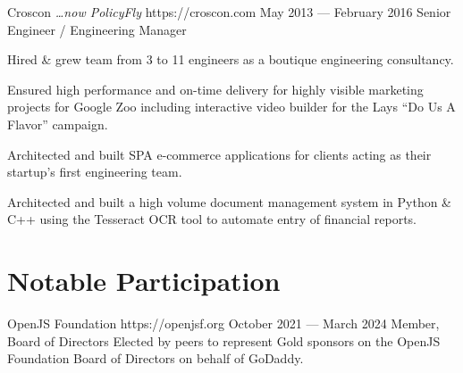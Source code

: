 \documentclass{resume}
\begin{document}
\employer
{Croscon \emph{\ldots now PolicyFly}}
{https://croscon.com}
{May 2013 --- February 2016}
{Senior Engineer / Engineering Manager}
{
  \begin{jobitems}
  \item Hired \& grew team from 3 to 11 engineers as a boutique engineering consultancy.
  \item Ensured high performance and on-time delivery for highly visible marketing projects for Google Zoo including interactive video builder for the Lays ``Do Us A Flavor'' campaign.
  \item Architected and built SPA e-commerce applications for clients acting as their startup's first engineering team.
  \item Architected and built a high volume document management system in Python \& C++ using the Tesseract OCR tool to automate entry of financial reports.
\end{jobitems}}





\section{Notable Participation}

\employer
{OpenJS Foundation}
{https://openjsf.org}
{October 2021 --- March 2024}
{Member, Board of Directors}
{Elected by peers to represent Gold sponsors on the OpenJS Foundation Board of Directors on behalf of GoDaddy.}
\end{document}
